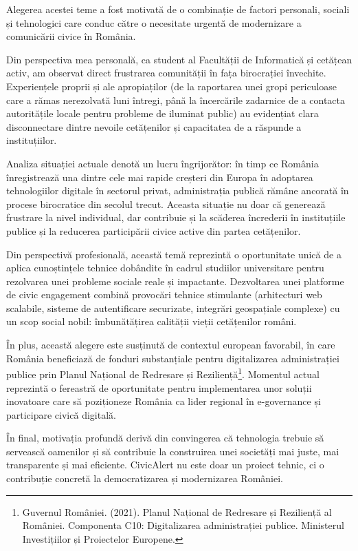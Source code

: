 \documentclass[12pt,a4paper]{report}
\begin{document}
Alegerea acestei teme a fost motivată de o combinație de factori personali, sociali și tehnologici care conduc către o necesitate urgentă de modernizare a comunicării civice în România.

Din perspectiva mea personală, ca student al Facultății de Informatică și cetățean activ, am observat direct frustrarea comunității în fața birocrației învechite. Experiențele proprii și ale apropiaților (de la raportarea unei gropi periculoase care a rămas nerezolvată luni întregi, până la încercările zadarnice de a contacta autoritățile locale pentru probleme de iluminat public) au evidențiat clara disconnectare dintre nevoile cetățenilor și capacitatea de a răspunde a instituțiilor.

Analiza situației actuale denotă un lucru îngrijorător: în timp ce România înregistrează una dintre cele mai rapide creșteri din Europa în adoptarea tehnologiilor digitale în sectorul privat, administrația publică rămâne ancorată în procese birocratice din secolul trecut. Aceasta situație nu doar că generează frustrare la nivel individual, dar contribuie și la scăderea încrederii în instituțiile publice și la reducerea participării civice active din partea cetățenilor.

Din perspectivă profesională, această temă reprezintă o oportunitate unică de a aplica cunoștințele tehnice dobândite în cadrul studiilor universitare pentru rezolvarea unei probleme sociale reale și impactante. Dezvoltarea unei platforme de civic engagement combină provocări tehnice stimulante (arhitecturi web scalabile, sisteme de autentificare securizate, integrări geospațiale complexe) cu un scop social nobil:  îmbunătățirea calității vieții cetățenilor români.

În plus, această alegere este susținută de contextul european favorabil, în care România beneficiază de fonduri substanțiale pentru digitalizarea administrației publice prin Planul Național de Redresare și Reziliență\footnote{Guvernul României. (2021). Planul Național de Redresare și Reziliență al României. Componenta C10: Digitalizarea administrației publice. Ministerul Investițiilor și Proiectelor Europene.}. Momentul actual reprezintă o fereastră de oportunitate pentru implementarea unor soluții inovatoare care să poziționeze România ca lider regional în e-governance și participare civică digitală.

În final, motivația profundă derivă din convingerea că tehnologia trebuie să servească oamenilor și să contribuie la construirea unei societăți mai juste, mai transparente și mai eficiente. CivicAlert nu este doar un proiect tehnic, ci o contribuție concretă la democratizarea și modernizarea României.
\newpage
\end{document}
